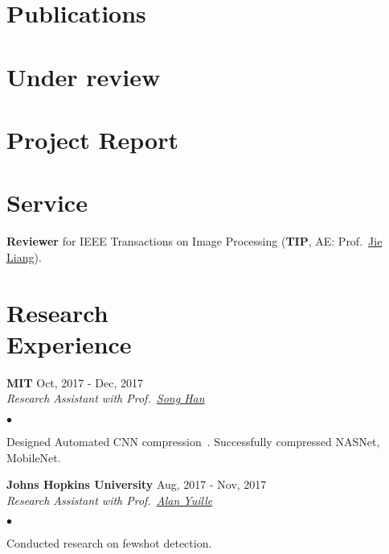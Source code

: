 \documentclass[margin,line]{res}
\newenvironment{list2}{
  \begin{list}{$\bullet$}{%
      \setlength{\itemsep}{0in}
      \setlength{\parsep}{0in} \setlength{\parskip}{0in}
      \setlength{\topsep}{0in} \setlength{\partopsep}{0in} 
      \setlength{\leftmargin}{0.2in}}}{\end{list}}
\begin{document}
\begin{resume}
\section{\sc Publications}
\printbibliography[heading=none, type=inproceedings]

\section{\sc Under review}
\printbibliography[heading=none, type=article]

\section{\sc Project Report}
\printbibliography[heading=none, type=misc]


\section{\sc Service}
{\bf Reviewer} for IEEE Transactions on Image Processing (\textbf{TIP}, AE: Prof.~\href{http://www.sfu.ca/~jiel/}{Jie Liang}).


\section{\sc Research \\Experience}
{\bf MIT} \hfill {Oct, 2017 - Dec, 2017}\\%

\vspace{-.3in}
{\em Research Assistant with Prof.~\href{https://stanford.edu/~songhan/}{Song Han}}
\begin{list2}
\item Designed Automated CNN compression~\cite{adc}. Successfully compressed NASNet, MobileNet.
\end{list2}

{\bf Johns Hopkins University} \hfill {Aug, 2017 - Nov, 2017}\\%

\vspace{-.3in}
{\em Research Assistant with Prof.~\href{http://www.cs.jhu.edu/~ayuille/}{Alan Yuille}}
\begin{list2}
\item Conducted research on fewshot detection.
\end{list2}


\end{resume}
\end{document}
